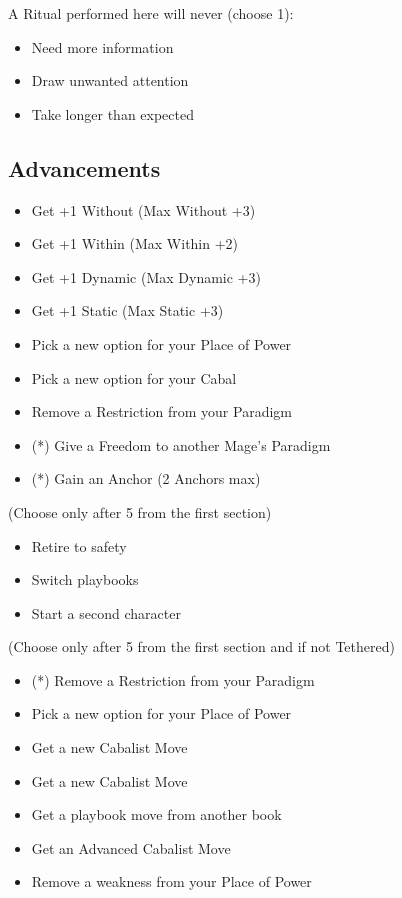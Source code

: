 \documentclass[
  oneside,
  statementpaper,
  9pt]{memoir}
\begin{document}
A Ritual performed here will never (choose 1):

\begin{itemize}
\tightlist
\item
  Need more information
\item
  Draw unwanted attention
\item
  Take longer than expected
\end{itemize}

\hypertarget{advancements}{%
\subsection{Advancements}\label{advancements}}

\begin{itemize}
\tightlist
\item
  Get +1 Without (Max Without +3)
\item
  Get +1 Within (Max Within +2)
\item
  Get +1 Dynamic (Max Dynamic +3)
\item
  Get +1 Static (Max Static +3)
\item
  Pick a new option for your Place of Power
\item
  Pick a new option for your Cabal
\item
  Remove a Restriction from your Paradigm
\item
  (*) Give a Freedom to another Mage's Paradigm
\item
  (*) Gain an Anchor (2 Anchors max)
\end{itemize}

(Choose only after 5 from the first section)

\begin{itemize}
\tightlist
\item
  Retire to safety
\item
  Switch playbooks
\item
  Start a second character
\end{itemize}

(Choose only after 5 from the first section and if not Tethered)

\begin{itemize}
\tightlist
\item
  (*) Remove a Restriction from your Paradigm
\item
  Pick a new option for your Place of Power
\item
  Get a new Cabalist Move
\item
  Get a new Cabalist Move
\item
  Get a playbook move from another book
\item
  Get an Advanced Cabalist Move
\item
  Remove a weakness from your Place of Power
\end{itemize}
\end{document}
